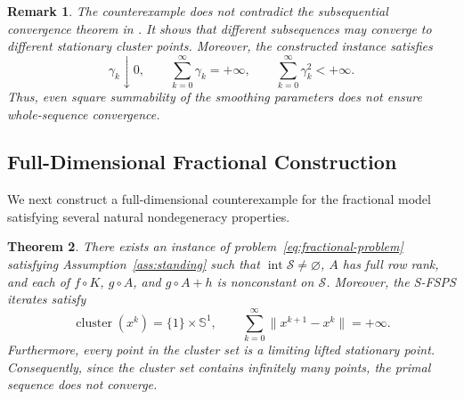\documentclass[11pt]{article}
\numberwithin{equation}{section}
\newtheorem{theorem}{Theorem}[section]
\newtheorem{remark}[theorem]{Remark}
\newcommand{\norm}[1]{\left\lVert #1\right\rVert}
\newcommand{\Sph}{\mathbb S}
\newcommand{\clust}{\operatorname{cluster}}
\begin{document}

\begin{remark}
The counterexample does not contradict the subsequential convergence theorem in
\cite{BotLiTao2025}. It shows that different subsequences may converge to
different stationary cluster points. Moreover, the constructed instance satisfies
\[
    \gamma_k\downarrow0,\qquad
    \sum_{k=0}^{\infty}\gamma_k=+\infty,
    \qquad
    \sum_{k=0}^{\infty}\gamma_k^2<+\infty.
\]
Thus, even square summability of the smoothing parameters does not
ensure whole-sequence convergence.
\end{remark}
\subsection{Full-Dimensional Fractional Construction}
We next construct a full-dimensional counterexample for the fractional model satisfying several natural nondegeneracy properties.

\begin{theorem}\label{thm:full-dimensional-counterexample}
There exists an instance of problem~\eqref{eq:fractional-problem}
satisfying Assumption~\ref{ass:standing} such that
\(\operatorname{int}\mathcal S\neq\varnothing\), \(A\) has full row
rank, and each of \(f\circ K\), \(g\circ A\), and \(g\circ A+h\) is
nonconstant on \(\mathcal S\). Moreover, the S-FSPS iterates satisfy
\[
    \operatorname{cluster}(x^k)=\{1\}\times\mathbb S^1,
    \qquad
    \sum_{k=0}^{\infty}\|x^{k+1}-x^k\|=+\infty.
\]
Furthermore, every point in the cluster set is a limiting lifted stationary point.
Consequently, since the cluster set contains infinitely many points,
the primal sequence does not converge.
\end{theorem}
\end{document}
